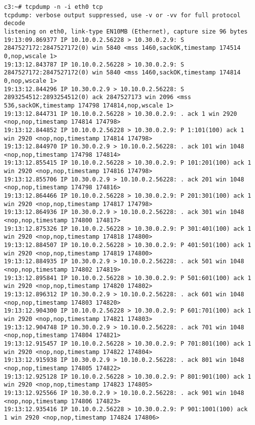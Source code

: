 \documentclass[a4paper,12pt]{article}
\begin{document}
\begin{lstlisting}
c3:~# tcpdump -n -i eth0 tcp
tcpdump: verbose output suppressed, use -v or -vv for full protocol decode
listening on eth0, link-type EN10MB (Ethernet), capture size 96 bytes
19:13:09.869377 IP 10.10.0.2.56228 > 10.30.0.2.9: S 2847527172:2847527172(0) win 5840 <mss 1460,sackOK,timestamp 174514 0,nop,wscale 1>
19:13:12.843787 IP 10.10.0.2.56228 > 10.30.0.2.9: S 2847527172:2847527172(0) win 5840 <mss 1460,sackOK,timestamp 174814 0,nop,wscale 1>
19:13:12.844296 IP 10.30.0.2.9 > 10.10.0.2.56228: S 2893254512:2893254512(0) ack 2847527173 win 2096 <mss 536,sackOK,timestamp 174798 174814,nop,wscale 1>
19:13:12.844731 IP 10.10.0.2.56228 > 10.30.0.2.9: . ack 1 win 2920 <nop,nop,timestamp 174814 174798>
19:13:12.844852 IP 10.10.0.2.56228 > 10.30.0.2.9: P 1:101(100) ack 1 win 2920 <nop,nop,timestamp 174814 174798>
19:13:12.844970 IP 10.30.0.2.9 > 10.10.0.2.56228: . ack 101 win 1048 <nop,nop,timestamp 174798 174814>
19:13:12.855415 IP 10.10.0.2.56228 > 10.30.0.2.9: P 101:201(100) ack 1 win 2920 <nop,nop,timestamp 174816 174798>
19:13:12.855706 IP 10.30.0.2.9 > 10.10.0.2.56228: . ack 201 win 1048 <nop,nop,timestamp 174798 174816>
19:13:12.864466 IP 10.10.0.2.56228 > 10.30.0.2.9: P 201:301(100) ack 1 win 2920 <nop,nop,timestamp 174817 174798>
19:13:12.864936 IP 10.30.0.2.9 > 10.10.0.2.56228: . ack 301 win 1048 <nop,nop,timestamp 174800 174817>
19:13:12.875326 IP 10.10.0.2.56228 > 10.30.0.2.9: P 301:401(100) ack 1 win 2920 <nop,nop,timestamp 174818 174800>
19:13:12.884507 IP 10.10.0.2.56228 > 10.30.0.2.9: P 401:501(100) ack 1 win 2920 <nop,nop,timestamp 174819 174800>
19:13:12.884935 IP 10.30.0.2.9 > 10.10.0.2.56228: . ack 501 win 1048 <nop,nop,timestamp 174802 174819>
19:13:12.895841 IP 10.10.0.2.56228 > 10.30.0.2.9: P 501:601(100) ack 1 win 2920 <nop,nop,timestamp 174820 174802>
19:13:12.896312 IP 10.30.0.2.9 > 10.10.0.2.56228: . ack 601 win 1048 <nop,nop,timestamp 174803 174820>
19:13:12.904300 IP 10.10.0.2.56228 > 10.30.0.2.9: P 601:701(100) ack 1 win 2920 <nop,nop,timestamp 174821 174803>
19:13:12.904748 IP 10.30.0.2.9 > 10.10.0.2.56228: . ack 701 win 1048 <nop,nop,timestamp 174804 174821>
19:13:12.915457 IP 10.10.0.2.56228 > 10.30.0.2.9: P 701:801(100) ack 1 win 2920 <nop,nop,timestamp 174822 174804>
19:13:12.915938 IP 10.30.0.2.9 > 10.10.0.2.56228: . ack 801 win 1048 <nop,nop,timestamp 174805 174822>
19:13:12.925128 IP 10.10.0.2.56228 > 10.30.0.2.9: P 801:901(100) ack 1 win 2920 <nop,nop,timestamp 174823 174805>
19:13:12.925566 IP 10.30.0.2.9 > 10.10.0.2.56228: . ack 901 win 1048 <nop,nop,timestamp 174806 174823>
19:13:12.935416 IP 10.10.0.2.56228 > 10.30.0.2.9: P 901:1001(100) ack 1 win 2920 <nop,nop,timestamp 174824 174806>

\end{lstlisting}
\end{document}
